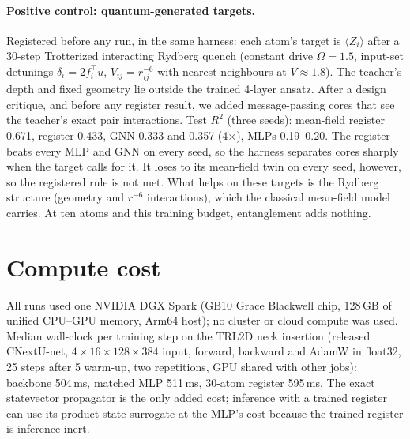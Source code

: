 \documentclass{article}
\begin{document}
\paragraph{Positive control: quantum-generated targets.} Registered before any run, in the same harness: each atom's
target is $\langle Z_i\rangle$ after a 30-step Trotterized interacting Rydberg quench (constant drive $\Omega{=}1.5$,
input-set detunings $\delta_i{=}2f_i^\top u$, $V_{ij}{=}r_{ij}^{-6}$ with nearest neighbours at $V{\approx}1.8$). The
teacher's depth and fixed geometry lie outside the trained 4-layer ansatz. After a design critique, and before any register
result, we added message-passing cores that see the teacher's exact pair interactions. Test $R^2$ (three seeds):
mean-field register 0.671, register 0.433, GNN 0.333 and 0.357 (4$\times$), MLPs 0.19--0.20. The register beats
every MLP and GNN on every seed, so the harness separates cores sharply when the target calls for it. It loses to its
mean-field twin on every seed, however, so the registered rule is not met. What helps on these targets is the
Rydberg structure (geometry and $r^{-6}$ interactions), which the classical mean-field model carries. At ten atoms and
this training budget, entanglement adds nothing.

\section{Compute cost}
\label{app:compute}
All runs used one NVIDIA DGX Spark (GB10 Grace Blackwell chip, 128\,GB of unified CPU--GPU memory, Arm64 host); no cluster or cloud compute was used.
Median wall-clock per training step on the TRL2D neck insertion (released CNextU-net, $4\times16\times128\times384$
input, forward, backward and AdamW in float32, 25 steps after 5 warm-up, two repetitions, GPU shared with other jobs):
backbone 504\,ms, matched MLP 511\,ms, 30-atom register 595\,ms. The exact statevector propagator is the only added cost;
inference with a trained register can use its product-state surrogate at the MLP's cost because the trained register is
inference-inert.
\end{document}
